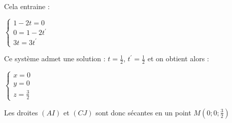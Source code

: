 \begin{corrige}
\begin{enumerate}
                                   \par
                                   Cela entraine :
                                   \par
                                   $\left\{ \begin{matrix} 1-2t=0 \\ 0=1-2t^{\prime} \\ 3t=3t^{\prime} \end{matrix}\right.$
                                        \par
                                        Ce système admet une solution : $t=\frac{1}{2}$, $t^{\prime}=\frac{1}{2}$ et on obtient alors :
                                        \par
                                        $\left\{ \begin{matrix} x=0 \\ y=0 \\ z=\frac{3}{2} \end{matrix}\right.$
                                             \par
                                             Les droites $\left(AI\right)$ et $\left(CJ\right)$ sont donc sécantes en un point $M\left(0 ; 0 ; \frac{3}{2}\right)$
                                        \end{enumerate}
                                   \end{corrige}
